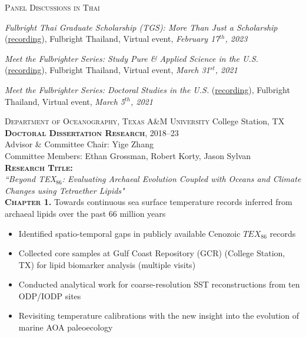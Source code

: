 \documentclass[10pt, letter]{article}
\newcommand{\margintext}[1]{\marginnote{\normalsize\textbf #1 |}}
\begin{document}
\textsc{Panel Discussions in Thai}
\begin{etaremune}
\item \textit{Fulbright Thai Graduate Scholarship (TGS): More Than Just a Scholarship} (\href{https://fb.watch/iLwkVkeNjJ/}{recording}), Fulbright Thailand, Virtual event, \textit{February 17$^{th}$, 2023}
\item \textit{Meet the Fulbrighter Series: Study Pure \& Applied Science in the U.S.} (\href{https://www.facebook.com/watch/?v=192470062421053}{recording}), Fulbright Thailand, Virtual event, \textit{March 31$^{st}$, 2021}
\item \textit{Meet the Fulbrighter Series: Doctoral Studies in the U.S.} (\href{https://www.facebook.com/watch/?v=1018096972055863}{recording}), Fulbright Thailand, Virtual event,\textit{ March 5$^{th}$, 2021} 
\end{etaremune}

\bigskip
\margintext{Previous Research Experience}
\textsc{Department of Oceanography, Texas A\&M University} \hfill College Station, TX \\
\textsc{\textbf{Doctoral Dissertation Research}}, 2018–23 \\
Advisor \& Committee Chair: Yige Zhang \\ 
Committee Members: Ethan Grossman, Robert Korty, Jason Sylvan \\

\textbf{\textsc{Research Title:}} \\
\textit{``Beyond TEX$_{86}$: Evaluating Archaeal Evolution Coupled with Oceans and Climate Changes using Tetraether Lipids"} \\

\textbf{\textsc{Chapter 1.}} Towards continuous sea surface temperature records inferred from archaeal lipids over the past 66 million years
\begin{itemize}[leftmargin=*]
    \item Identified spatio-temporal gaps in publicly available Cenozoic $TEX_{86}$ records
    \item Collected core samples at Gulf Coast Repository (GCR) (College Station, TX) for lipid biomarker analysis (multiple visits)
    \item Conducted analytical work for coarse-resolution SST reconstructions from ten ODP/IODP sites
    \item Revisiting temperature calibrations with the new insight into the evolution of marine AOA paleoecology
\end{itemize}   
\end{document}
